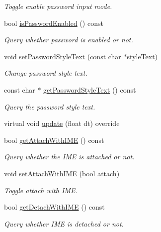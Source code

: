 \begin{DoxyCompactItemize}
\begin{DoxyCompactList}\small\item\em Toggle enable password input mode. \end{DoxyCompactList}\item 
bool \hyperlink{classui_1_1TextField_afc35114b2c350de28a400baeb2c56b8f}{is\+Password\+Enabled} () const
\begin{DoxyCompactList}\small\item\em Query whether password is enabled or not. \end{DoxyCompactList}\item 
void \hyperlink{classui_1_1TextField_a787ba67bbd76be259b96b0a44407038a}{set\+Password\+Style\+Text} (const char $\ast$style\+Text)
\begin{DoxyCompactList}\small\item\em Change password style text. \end{DoxyCompactList}\item 
const char $\ast$ \hyperlink{classui_1_1TextField_a3b875db0a0ed2e099a1f6ead951470ed}{get\+Password\+Style\+Text} () const
\begin{DoxyCompactList}\small\item\em Query the password style text. \end{DoxyCompactList}\item 
virtual void \hyperlink{classui_1_1TextField_a9caf0239e6855d3f608946b432b9ad59}{update} (float dt) override
\item 
bool \hyperlink{classui_1_1TextField_ac71f515312d2201aaa5db7ecff2f3fc4}{get\+Attach\+With\+I\+ME} () const
\begin{DoxyCompactList}\small\item\em Query whether the I\+ME is attached or not. \end{DoxyCompactList}\item 
void \hyperlink{classui_1_1TextField_a987520fa2d96e9326a628bc1f9521605}{set\+Attach\+With\+I\+ME} (bool attach)
\begin{DoxyCompactList}\small\item\em Toggle attach with I\+ME. \end{DoxyCompactList}\item 
bool \hyperlink{classui_1_1TextField_a93e9883ab554e898380cc643a962126e}{get\+Detach\+With\+I\+ME} () const
\begin{DoxyCompactList}\small\item\em Query whether I\+ME is detached or not. \end{DoxyCompactList}\item 

\end{DoxyCompactItemize}
